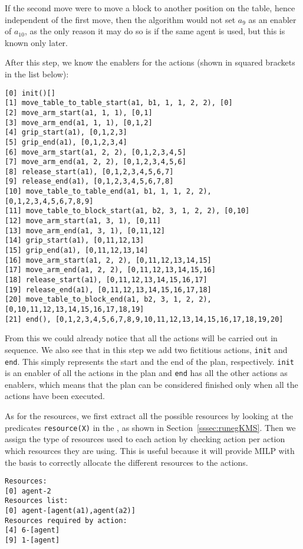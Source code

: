 If the second move were to move a block to another position on the table, hence independent of the first move, then the algorithm would not set $a_9$ as an enabler of $a_{10}$, as the only reason it may do so is if the same agent is used, but this is known only later.

After this step, we know the enablers for the actions (shown in squared brackets in the list below):

\begin{verbatim}
[0] init()[]
[1] move_table_to_table_start(a1, b1, 1, 1, 2, 2), [0]
[2] move_arm_start(a1, 1, 1), [0,1]
[3] move_arm_end(a1, 1, 1), [0,1,2]
[4] grip_start(a1), [0,1,2,3]
[5] grip_end(a1), [0,1,2,3,4]
[6] move_arm_start(a1, 2, 2), [0,1,2,3,4,5]
[7] move_arm_end(a1, 2, 2), [0,1,2,3,4,5,6]
[8] release_start(a1), [0,1,2,3,4,5,6,7]
[9] release_end(a1), [0,1,2,3,4,5,6,7,8]
[10] move_table_to_table_end(a1, b1, 1, 1, 2, 2), [0,1,2,3,4,5,6,7,8,9]
[11] move_table_to_block_start(a1, b2, 3, 1, 2, 2), [0,10]
[12] move_arm_start(a1, 3, 1), [0,11]
[13] move_arm_end(a1, 3, 1), [0,11,12]
[14] grip_start(a1), [0,11,12,13]
[15] grip_end(a1), [0,11,12,13,14]
[16] move_arm_start(a1, 2, 2), [0,11,12,13,14,15]
[17] move_arm_end(a1, 2, 2), [0,11,12,13,14,15,16]
[18] release_start(a1), [0,11,12,13,14,15,16,17]
[19] release_end(a1), [0,11,12,13,14,15,16,17,18]
[20] move_table_to_block_end(a1, b2, 3, 1, 2, 2), [0,10,11,12,13,14,15,16,17,18,19]
[21] end(), [0,1,2,3,4,5,6,7,8,9,10,11,12,13,14,15,16,17,18,19,20]
\end{verbatim}

From this we could already notice that all the actions will be carried out in sequence. We also see that in this step we add two fictitious actions, \verb|init| and \verb|end|. This simply represents the start and the end of the plan, respectively. \verb|init| is an enabler of all the actions in the plan and \verb|end| has all the other actions as enablers, which means that the plan can be considered finished only when all the actions have been executed.

As for the resources, we first extract all the possible resources by looking at the predicates \verb|resource(X)| in the \kb, as shown in Section~\ref{sssec:runegKMS}. Then we assign the type of resources used to each action by checking action per action which resources they are using. This is useful because it will provide MILP with the basis to correctly allocate the different resources to the actions.

\begin{verbatim}
Resources:
[0] agent-2
Resources list:
[0] agent-[agent(a1),agent(a2)]
Resources required by action:
[4] 6-[agent]
[9] 1-[agent]
\end{verbatim}

